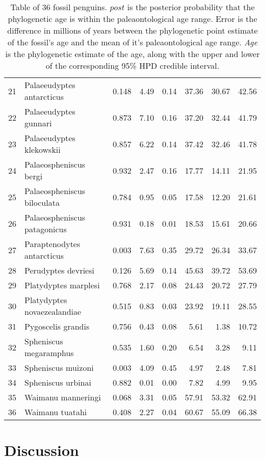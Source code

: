 \documentclass[11pt]{article}
\begin{document}
\begin{table}[ht]
\begin{tabular}{rlrrrrrr}
  21 & Palaeeudyptes antarcticus & 0.148 & 4.49 & 0.14 & 37.36 & 30.67 & 42.56 \\ 
  22 & Palaeeudyptes gunnari & 0.873 & 7.10 & 0.16 & 37.20 & 32.44 & 41.79 \\ 
  23 & Palaeeudyptes klekowskii & 0.857 & 6.22 & 0.14 & 37.42 & 32.46 & 41.78 \\ 
  24 & Palaeospheniscus bergi & 0.932 & 2.47 & 0.16 & 17.77 & 14.11 & 21.95 \\ 
  25 & Palaeospheniscus biloculata & 0.784 & 0.95 & 0.05 & 17.58 & 12.20 & 21.61 \\ 
  26 & Palaeospheniscus patagonicus & 0.931 & 0.18 & 0.01 & 18.53 & 15.61 & 20.66 \\ 
  27 & Paraptenodytes antarcticus & 0.003 & 7.63 & 0.35 & 29.72 & 26.34 & 33.67 \\ 
  28 & Perudyptes devriesi & 0.126 & 5.69 & 0.14 & 45.63 & 39.72 & 53.69 \\ 
  29 & Platydyptes marplesi & 0.768 & 2.17 & 0.08 & 24.43 & 20.72 & 27.79 \\ 
  30 & Platydyptes novaezealandiae & 0.515 & 0.83 & 0.03 & 23.92 & 19.11 & 28.55 \\ 
  31 & Pygoscelis grandis & 0.756 & 0.43 & 0.08 & 5.61 & 1.38 & 10.72 \\ 
  32 & Spheniscus megaramphus & 0.535 & 1.60 & 0.20 & 6.54 & 3.28 & 9.11 \\ 
  33 & Spheniscus muizoni & 0.003 & 4.09 & 0.45 & 4.97 & 2.48 & 7.81 \\ 
  34 & Spheniscus urbinai & 0.882 & 0.01 & 0.00 & 7.82 & 4.99 & 9.95 \\ 
  35 & Waimanu manneringi & 0.068 & 3.31 & 0.05 & 57.91 & 53.32 & 62.91 \\ 
  36 & Waimanu tuatahi & 0.408 & 2.27 & 0.04 & 60.67 & 55.09 & 66.38 \\ 
   \hline
\end{tabular}
\caption{\label{fossilTable}Table of 36 fossil penguins. $post$ is the posterior probability that the phylogenetic age is within the paleaontological age range. Error is the difference in millions of years between the phylogenetic point estimate of the fossil's age and the mean of it's paleaontological age range. {\em Age} is the phylogenetic estimate of the age, along with the upper and lower of the corresponding 95\% HPD credible interval.}
\end{table}

\section*{Discussion}
\end{document}
